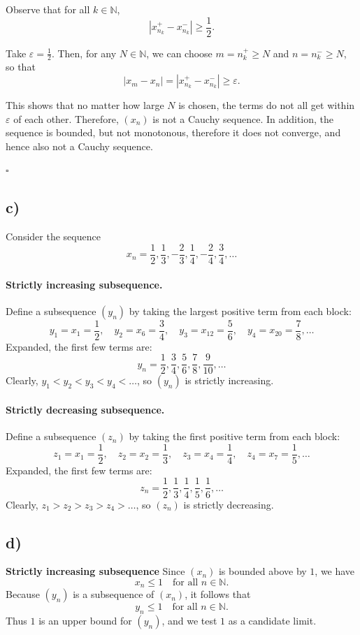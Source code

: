 \documentclass[12pt]{article}
\begin{document}
Observe that for all $k \in \mathbb{N}$,
\[
	|x_{n_k}^{+} - x_{n_k}^{-}| \ge \frac{1}{2}.
\]

Take $\varepsilon = \frac{1}{2}$. Then, for any $N \in \mathbb{N}$, we can choose $m = n_k^{+} \ge N$ and $n = n_k^{-} \ge N$, so that
\[
	|x_m - x_n| = |x_{n_k}^{+} - x_{n_k}^{-}| \ge \varepsilon.
\]

This shows that no matter how large $N$ is chosen, the terms do not all get within $\varepsilon$ of each other. Therefore, $(x_n)$ is not a Cauchy sequence. In addition, the sequence is bounded, but not monotonous, therefore it does not converge, and hence also not a Cauchy sequence.

\hfill $\square$
\subsection*{c)}
Consider the sequence
\[
	x_n = \frac{1}{2}, \frac{1}{3}, -\frac{2}{3}, \frac{1}{4}, -\frac{2}{4}, \frac{3}{4}, \dots
\]

\paragraph{Strictly increasing subsequence.} Define a subsequence $(y_n)$ by taking the largest positive term from each block:
\[
	y_1 = x_1 = \frac{1}{2}, \quad
	y_2 = x_6 = \frac{3}{4}, \quad
	y_3 = x_{12} = \frac{5}{6}, \quad
	y_4 = x_{20} = \frac{7}{8}, \dots
\]
Expanded, the first few terms are:
\[
	y_n = \frac{1}{2}, \frac{3}{4}, \frac{5}{6}, \frac{7}{8}, \frac{9}{10}, \dots
\]
Clearly, $y_1 < y_2 < y_3 < y_4 < \dots$, so $(y_n)$ is strictly increasing.

\paragraph{Strictly decreasing subsequence.} Define a subsequence $(z_n)$ by taking the first positive term from each block:
\[
	z_1 = x_1 = \frac{1}{2}, \quad
	z_2 = x_2 = \frac{1}{3}, \quad
	z_3 = x_4 = \frac{1}{4}, \quad
	z_4 = x_7 = \frac{1}{5}, \dots
\]
Expanded, the first few terms are:
\[
	z_n = \frac{1}{2}, \frac{1}{3}, \frac{1}{4}, \frac{1}{5}, \frac{1}{6}, \dots
\]
Clearly, $z_1 > z_2 > z_3 > z_4 > \dots$, so $(z_n)$ is strictly decreasing.
\subsection*{d)}
\textbf{Strictly increasing subsequence}
Since $(x_n)$ is bounded above by $1$, we have
\[
	x_n \le 1 \quad \text{for all } n \in \mathbb{N}.
\]
Because $(y_n)$ is a subsequence of $(x_n)$, it follows that
\[
	y_n \le 1 \quad \text{for all } n \in \mathbb{N}.
\]
Thus $1$ is an upper bound for $(y_n)$, and we test $1$ as a candidate limit.
\end{document}
